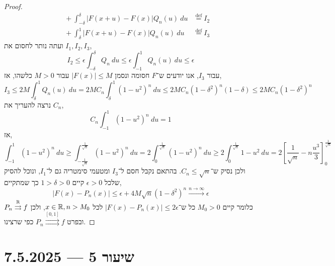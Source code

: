 \begin{proof}
\begin{align*}
		&\quad + \int_{-\delta}^{\delta} |F(x + u) - F(x)| Q_n(u)\ du & \overset{\text{def}}{=}  I_2 \\
		&\quad + \int_{\delta}^1 |F(x + u) - F(x)| Q_n(u)\ du & \overset{\text{def}}{=}  I_3
	\end{align*}
	ועתה נותר לחסום את $I_1, I_2, I_3$,
	\[
		I_2
		\le \epsilon \int_{-\delta}^{\delta} Q_n\ du
		\le \epsilon \int_{-1}^{1} Q_n(u)\ du
		\le \epsilon
	\]
	עבור $I_3$, אנו יודעים ש־$F$ חסומה ונסמן $|F(x)| \le M$ עבור $M > 0$ כלשהו, אז,
	\[
		I_3
		\le 2M \int_{\delta}^{1} Q_n(u)\ du
		= 2M C_n \int_{\delta}^{1} {(1 - u^2)}^n\ du
		\le 2M C_n {(1 - \delta^2)}^n (1 - \delta)
		\le 2M C_n {(1 - \delta^2)}^n
	\]
	נרצה להעריך את $C_n$,
	\[
		C_n \int_{-1}^{1} {(1 - u^2)}^n\ du = 1
	\]
	אז,
	\[
		\int_{-1}^{1} {(1 - u^2)}^n\ du
		\ge \int_{-\frac{1}{\sqrt{n}}}^{\frac{1}{\sqrt{n}}} {(1 - u^2)}^n\ du
		= 2 \int_0^{\frac{1}{\sqrt{n}}} {(1 - u^2)}^n\ du
		\ge 2 \int_0^{\frac{1}{\sqrt{n}}} 1 - u^2\ du
		= 2 {\left[ \frac{1}{\sqrt{n}} - n \frac{u^3}{3}\right]}_0^{\frac{1}{\sqrt{n}}}
	\]
	ולכן נסיק ש־$C_n \le \sqrt{n}$.
	בהתאם נקבל חסם ל־$I_3$ ומטעמי סימטריה גם ל־$I_1$, ונוכל להסיק שלכל $\epsilon > 0$ קיים $1 > \delta > 0$ כך שמתקיים,
	\[
		|F(x) - P_n(x)|
		\le \epsilon + 4M \sqrt{n} {(1 - \delta^2)}^n
		\xrightarrow{n \to \infty} \epsilon
	\]
	כלומר קיים $M_0 > 0$ כל ש־$|F(x) - P_n(x)| \le 2 \epsilon$ לכל $x \in \mathbb{R}, n > M_0$, ולכן $P_n \overset{\mathbb{R}}{\rightrightarrows} f$ ובפרט $P_n \overset{[0, 1]}{\rightrightarrows} f$ כפי שרצינו.
\end{proof}

\section{שיעור 5 --- 7.5.2025}
